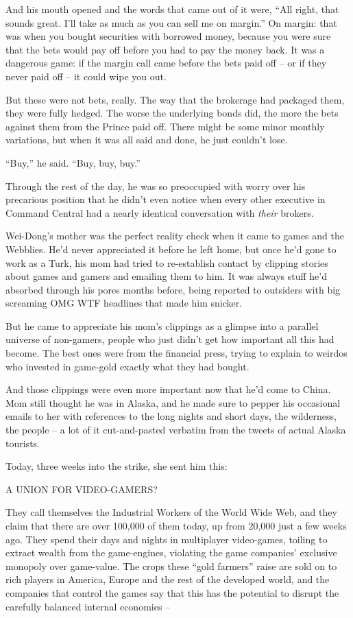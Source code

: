 And his mouth opened and the words that came out of it were, ``All
right, that sounds great. I'll take as much as you can sell me on
margin.'' On margin: that was when you bought securities with
borrowed money, because you were sure that the bets would pay off
before you had to pay the money back. It was a dangerous game: if
the margin call came before the bets paid off -- or if they never
paid off -- it could wipe you out.

But these were not bets, really. The way that the brokerage had
packaged them, they were fully hedged. The worse the underlying
bonds did, the more the bets against them from the Prince paid off.
There might be some minor monthly variations, but when it was all
said and done, he just couldn't lose.

``Buy,'' he said. ``Buy, buy, buy.''

Through the rest of the day, he was so preoccupied with worry over
his precarious position that he didn't even notice when every other
executive in Command Central had a nearly identical conversation
with \emph{their} brokers.

\tb

Wei-Dong's mother was the perfect reality check when it came to
games and the Webblies. He'd never appreciated it before he left
home, but once he'd gone to work as a Turk, his mom had tried to
re-establish contact by clipping stories about games and gamers and
emailing them to him. It was always stuff he'd absorbed through his
pores months before, being reported to outsiders with big screaming
OMG WTF headlines that made him snicker.

But he came to appreciate his mom's clippings as a glimpse into a
parallel universe of non-gamers, people who just didn't get how
important all this had become. The best ones were from the
financial press, trying to explain to weirdos who invested in
game-gold exactly what they had bought.

And those clippings were even more important now that he'd come to
China. Mom still thought he was in Alaska, and he made sure to
pepper his occasional emails to her with references to the long
nights and short days, the wilderness, the people -- a lot of it
cut-and-pasted verbatim from the tweets of actual Alaska tourists.

Today, three weeks into the strike, she sent him this:

A UNION FOR VIDEO-GAMERS?

They call themselves the Industrial Workers of the World Wide Web,
and they claim that there are over 100,000 of them today, up from
20,000 just a few weeks ago. They spend their days and nights in
multiplayer video-games, toiling to extract wealth from the
game-engines, violating the game companies' exclusive monopoly over
game-value. The crops these ``gold farmers'' raise are sold on to
rich players in America, Europe and the rest of the developed
world, and the companies that control the games say that this has
the potential to disrupt the carefully balanced internal economies
--

